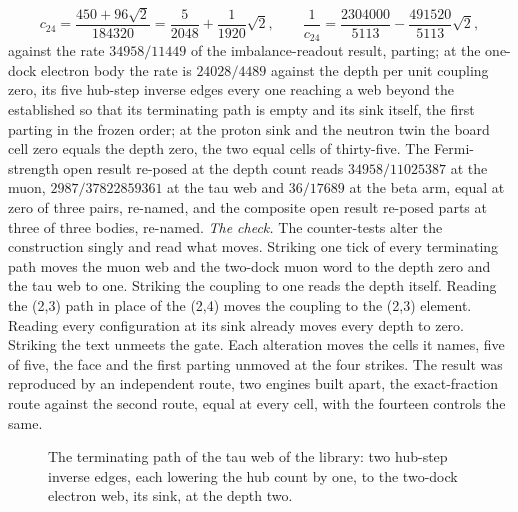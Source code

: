 \begin{chproof}
\begin{equation} c_{24} = \frac{450 + 96\sqrt{2}}{184320} = \frac{5}{2048} + \frac{1}{1920}\sqrt{2}, \qquad \frac{1}{c_{24}} = \frac{2304000}{5113} - \frac{491520}{5113}\sqrt{2}, \end{equation}
against the rate $34958/11449$ of the imbalance-readout result, parting; at the one-dock electron body the rate is $24028/4489$ against the depth per unit coupling zero, its five hub-step inverse edges every one reaching a web beyond the established so that its terminating path is empty and its sink itself, the first parting in the frozen order; at the proton sink and the neutron twin the board cell zero equals the depth zero, the two equal cells of thirty-five. The Fermi-strength open result re-posed at the depth count reads $34958/11025387$ at the muon, $2987/37822859361$ at the tau web and $36/17689$ at the beta arm, equal at zero of three pairs, re-named, and the composite open result re-posed parts at three of three bodies, re-named.
\textit{The check.} The counter-tests alter the construction singly and read what moves. Striking one tick of every terminating path moves the muon web and the two-dock muon word to the depth zero and the tau web to one. Striking the coupling to one reads the depth itself. Reading the (2,3) path in place of the (2,4) moves the coupling to the (2,3) element. Reading every configuration at its sink already moves every depth to zero. Striking the text unmeets the gate. Each alteration moves the cells it names, five of five, the face and the first parting unmoved at the four strikes. The result was reproduced by an independent route, two engines built apart, the exact-fraction route against the second route, equal at every cell, with the fourteen controls the same.
\begin{figure}[h]\centering{}\caption{The terminating path of the tau web of the library: two hub-step inverse edges, each lowering the hub count by one, to the two-dock electron web, its sink, at the depth two.}\end{figure}
\end{chproof}
